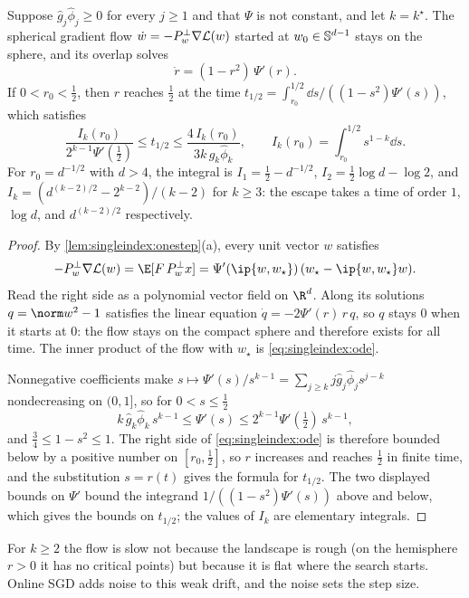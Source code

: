 \begin{refsection}
\begin{theorem}\label{thm:singleindex:flow}
Suppose $\hat g_j\hat\phi_j\ge0$ for every $j\ge1$ and that $\Psi$ is not constant, and let $k=k^\star$. The spherical gradient flow $\dot w=-P_w^\perp\nabla\mathcal{L}(w)$ started at $w_0\in\mathbb{S}^{d-1}$ stays on the sphere, and its overlap solves
\begin{equation}\label{eq:singleindex:ode}
  \dot r=(1-r^2)\,\Psi'(r).
\end{equation}
If $0<r_0<\frac12$, then $r$ reaches $\frac12$ at the time $t_{1/2}=\int_{r_0}^{1/2}\dd s/((1-s^2)\Psi'(s))$, which satisfies
\[
  \frac{I_k(r_0)}{2^{k-1}\Psi'(\frac12)}\le t_{1/2}\le\frac{4\,I_k(r_0)}{3k\,\hat g_k\hat\phi_k},\qquad I_k(r_0)=\int_{r_0}^{1/2}s^{1-k}\dd s .
\]
For $r_0=d^{-1/2}$ with $d>4$, the integral is $I_1=\frac12-d^{-1/2}$, $I_2=\frac12\log d-\log2$, and $I_k=(d^{(k-2)/2}-2^{k-2})/(k-2)$ for $k\ge3$: the escape takes a time of order $1$, $\log d$, and $d^{(k-2)/2}$ respectively.
\end{theorem}

\begin{proof}
By \cref{lem:singleindex:onestep}(a), every unit vector $w$ satisfies
\[
  -P_w^\perp\nabla\Loss(w)=\E[F\,P_w^\perp x]=\Psi'(\ip{w,w_\star})\,(w_\star-\ip{w,w_\star}w).
\]
Read the right side as a polynomial vector field on $\R^d$. Along its solutions $q=\norm w^2-1$ satisfies the linear equation $\dot q=-2\Psi'(r)\,r\,q$, so $q$ stays $0$ when it starts at $0$: the flow stays on the compact sphere and therefore exists for all time. The inner product of the flow with $w_\star$ is \eqref{eq:singleindex:ode}.

Nonnegative coefficients make $s\mapsto\Psi'(s)/s^{k-1}=\sum_{j\ge k}j\hat g_j\hat\phi_js^{j-k}$ nondecreasing on $(0,1]$, so for $0<s\le\frac12$
\[
  k\,\hat g_k\hat\phi_k\,s^{k-1}\le\Psi'(s)\le2^{k-1}\Psi'(\tfrac12)\,s^{k-1},
\]
and $\frac34\le1-s^2\le1$. The right side of \eqref{eq:singleindex:ode} is therefore bounded below by a positive number on $[r_0,\frac12]$, so $r$ increases and reaches $\frac12$ in finite time, and the substitution $s=r(t)$ gives the formula for $t_{1/2}$. The two displayed bounds on $\Psi'$ bound the integrand $1/((1-s^2)\Psi'(s))$ above and below, which gives the bounds on $t_{1/2}$; the values of $I_k$ are elementary integrals.
\end{proof}

For $k\ge2$ the flow is slow not because the landscape is rough (on the hemisphere $r>0$ it has no critical points) but because it is flat where the search starts. Online SGD adds noise to this weak drift, and the noise sets the step size.


\end{refsection}
